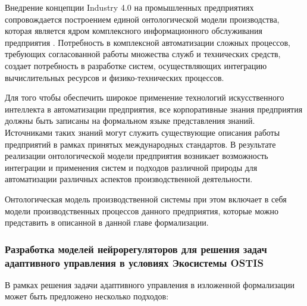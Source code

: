 Внедрение концепции Industry 4.0 на промышленных предприятиях сопровождается построением единой онтологической модели производства, которая является ядром комплексного информационного обслуживания предприятия . Потребность в комплексной автоматизации сложных процессов, требующих согласованной работы множества служб и технических средств, создает потребность в разработке систем, осуществляющих интеграцию вычислительных ресурсов и физико-технических процессов.

Для того чтобы обеспечить широкое применение технологий искусственного интеллекта в автоматизации предприятия, все корпоративные знания предприятия должны быть записаны на формальном языке представления знаний. Источниками таких знаний могут служить существующие описания работы предприятий в рамках принятых международных стандартов. В результате реализации онтологической модели предприятия возникает возможность интеграции и применения систем и подходов различной природы для автоматизации различных аспектов производственной деятельности.

Онтологическая модель производственной системы при этом включает в себя модели производственных процессов данного предприятия, которые можно представить в описанной в данной главе формализации. 


\subsubsection{Разработка моделей нейрорегуляторов для решения задач адаптивного управления в условиях Экосистемы OSTIS}

В рамках решения задачи адаптивного управления в изложенной формализации может быть предложено несколько подходов:

